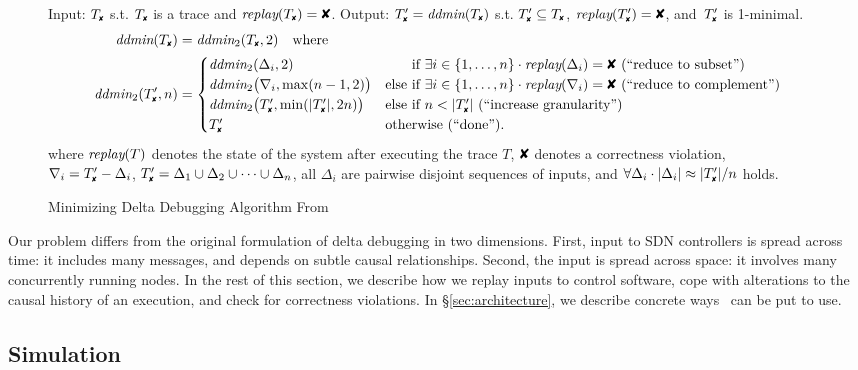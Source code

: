 \begin{figure}[t]
\caption{Minimizing Delta Debugging Algorithm From~\cite{Zeller:2002:SIF:506201.506206}}
\begin{boxedminipage}{\textwidth}
Input: $\cfail$ s.t. $\cfail$ is a trace and $\test(\cfail) = \FAIL$. Output: $\dfail
= \ddmin(\cfail)$ s.t. $\dfail \subseteq
\cfail$, $\test(\dfail) = \FAIL$, and~$\dfail$ is 1-minimal.
\begin{align*}
\ddmin(\cfail) &= \ddmin_2(\cfail, 2) \quad \text{where} \\
\ddmin_2(\dfail, n) &= 
\begin{cases}
\ddmin_2(\Delta_i, 2) & \text{\hphantom{else }if $\exists i \in \{1, \dots, n\} \cdot \test(\Delta_i) = \FAIL$ (``reduce to subset'')} \\
\ddmin_2\bigl(\nabla_i, \max(n - 1, 2)\bigr) & 
\text{else if $\exists i \in \{1, \dots, n\} \cdot \test(\nabla_i) = \FAIL$ (``reduce to complement'')} \\
\ddmin_2\bigl(\dfail, \min(|\dfail|, 2n)\bigr) & \text{else if $n < |\dfail|$ (``increase granularity'')} \\
\dfail & \text{otherwise (``done'').}
\end{cases}
\end{align*}
where $\textit{replay}(T)$ denotes the state of the system after executing the trace $T$,
$\FAIL$ denotes a correctness violation, \\
$\nabla_i = \dfail - \Delta_i$, $\dfail = \Delta_1 \cup \Delta_2 \cup \dots \cup \Delta_n$, all
$\Delta_i$ are pairwise disjoint sequences of inputs, and $\forall \Delta_i \cdot |\Delta_i| \approx |\dfail| / n$
holds.
\end{boxedminipage}
\label{fig:ddmin}
\end{figure}

Our problem differs from the original formulation of delta debugging in two dimensions.
First, input to SDN controllers is spread
across time: it includes many messages, and depends on subtle causal
relationships. Second, the input is spread across space: it involves
many concurrently running nodes.
In the rest of this section, we describe how we
replay inputs to control software,
cope with alterations to the causal history of an execution, and check
for correctness violations. In \S\ref{sec:architecture}, we describe concrete
ways \simulator~can be put to use.

\subsection{Simulation}
\label{subsec:simulation}

